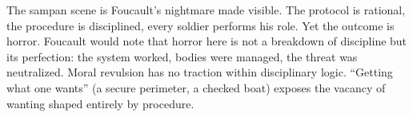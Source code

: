 The sampan scene is Foucault's nightmare made visible. The protocol is rational, the procedure 
is disciplined, every soldier performs his role. Yet the outcome is horror. Foucault would note 
that horror here is not a breakdown of discipline but its perfection: the system worked, bodies 
were managed, the threat was neutralized. Moral revulsion has no traction within disciplinary 
logic. ``Getting what one wants'' (a secure perimeter, a checked boat) exposes the vacancy of 
wanting shaped entirely by procedure.

